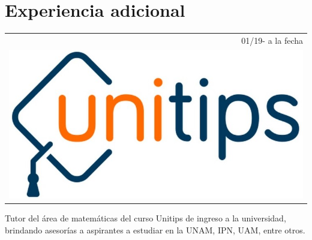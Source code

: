 \documentclass[]{friggeri-cv}
\begin{document}
\section{Experiencia adicional}
\begin{entrylist}
\entry
    {   \begin{tabular}{r}
    		01/19- a la fecha  \\
     		\includegraphics[scale=0.09]{img/unitips.jpg}
	\end{tabular}
    }
    {\vspace{-1.05cm}}
    { }
    {Tutor del área de matemáticas del curso Unitips de ingreso a la universidad, brindando asesorías a aspirantes a estudiar en la UNAM, IPN, UAM, entre otros.}


\end{entrylist}
\end{document}
